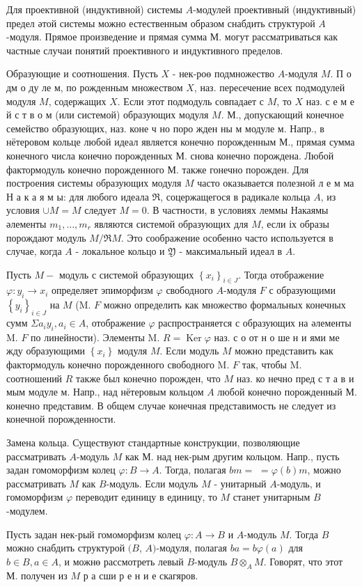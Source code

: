 \documentclass[10pt]{article}
\begin{document}
Для проективной (индуктивной) системы $A$-модулей проективный (индуктивный) предел әтой системы можно естественным образом снабдить структурой $A$-модуля. Прямое произведение и прямая сумма М. могут рассматриваться как частные случаи понятий проективного и индуктивного пределов.



Образующие и соотношения. Пусть $X$ - нек-роө подмножество $A$-модуля $M$. П о дм о ду ле м, по рожденным множеством $X$, наз. пересечение всех подмодулей модуля $M$, содержащих $X$. Если этот подмодуль совпадает с $M$, то $X$ наз. с е м е й с т в о м (или системой) образующих модуля $M$. М., допускающий конечное семейство образующих, наз. коне ч но поро жден ны м модуле м. Напр., в нётеровом кольце любой идеал является конечно порожденным М., прямая сумма конечного числа конечно порожденных М. снова конечно порождена. Любой фактормодуль конечно порожденного М. также гонечно порожден. Для построения системы образующих модуля $M$ часто оказывается полезной л е м ма Н а к а я м ы: для любого идеала $\Re$, соцержащегося в радикале кольца $A$, из условия $\boldsymbol{\cup} M=M$ следует $M=0$. В частности, в условиях леммы Накаямы әлементы $m_{1}, \ldots, m_{r}$ являются системой образующих для $M$, если іх образы порождают модуль $M / \mathfrak{\Re} M$. Это соображение особенно часто используется в случае, когда $A$ - локальное кольцо и $\mathfrak{Y}$ - максимальный идеал в $A$.



Пусть $M-$ модуль с системой образующих $\left\{x_{i}\right\}_{i \in J}$. Тогда отображение $\varphi: y_{i} \rightarrow x_{i}$ определяет эпиморфизм $\varphi$ свободного $A$-модуля $F$ с образующими $\left\{y_{i}\right\}_{i \in J}$ на $M$ (M. $F$ можно определить как множество формальных конечных сумм $\Sigma a_{i} y_{i}, a_{i} \in A$, отображение $\varphi$ распространяется с образующих на әлементы M. $F$ по линейности). Элементы M. $R=\operatorname{Ker} \varphi$ наз. с о от н о ше н и ями ме жду образующими $\left\{x_{i}\right\}$ модуля $M$. Если модуль $M$ можно представить как фактормодуль конечно порожденного свободного M. $F$ так, чтобы M. соотношений $R$ также был конечно порожден, что $M$ наз. ко нечно пред с т а в и мым модуле м. Напр., над нётеровым кольцом $A$ любой конечно порожденный М. конечно представим. В общем случае конечная представимость не следует из конечной порожденности.



Замена кольца. Существуют стандартные конструкции, позволяющие рассматривать $A$-модуль $M$ как М. над нек-рым другим кольцом. Напр., пусть задан гомоморфизм колец $\varphi: B \rightarrow A$. Тогда, полагая $b m=$ $=\varphi(b) m$, можно рассматривать $M$ как $B$-модуль. Если модуль $M$ - унитарный $A$-модуль, и гомоморфизм $\varphi$ переводит единицу в единицу, то $M$ станет унитарным $B$-модулем.



Пусть задан нек-рый гомоморфизм колец $\varphi: A \rightarrow B$ и $A$-модуль $M$. Тогда $B$ можно снабдить структурой $(B$, $A)$-модуля, полагая $b a=b \varphi(a)$ для $b \in B, a \in A$, и можнө рассмотреть левый $B$-модуль $B \otimes_{A} M$. Говорят, что этот М. получен из $M$ р а сши р е н и е скагяров.
\end{document}
